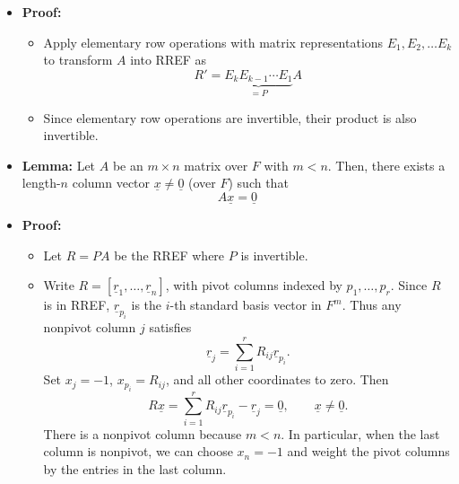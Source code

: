\documentclass[11pt,twoside]{report}
\newcommand{\vecnot}{\underline}
\newcommand{\Id}{{\mathrm{I}}}
\begin{document}
\begin{itemize}
\item \textbf{Proof:}
\begin{itemize}
\item Apply elementary row operations with matrix representations  $E_1, E_2, \dots E_k$ to transform $A$ into RREF as%
\[
R' = \underbrace{ E_k E_{k-1} \cdots E_1}_{  = P}  A 
\]
\item  Since elementary row operations are invertible, their product is also  invertible. 

\end{itemize}



\item \textbf{Lemma:} 
Let $A$ be an $m \times n$ matrix over $F$ with $m<n$. Then, there exists a length-$n$ column vector $\vecnot{x} \neq \vecnot{0}$ (over $F$) such that
\[
A \vecnot{x} = \vecnot{0}
\]

\item \textbf{Proof:} 
\begin{itemize}
\item Let $R = P A$ be the RREF where $P$ is invertible. 


\item Write $R=[\vecnot{r}_1,\ldots,\vecnot{r}_n]$, with pivot columns indexed by $p_1,\ldots,p_r$.  Since $R$ is in RREF, $\vecnot{r}_{p_i}$ is the $i$-th standard basis vector in $F^m$.  Thus any nonpivot column $j$ satisfies
\[
\vecnot{r}_j=\sum_{i=1}^r R_{ij}\vecnot{r}_{p_i}.
\]
Set $x_j=-1$, $x_{p_i}=R_{ij}$, and all other coordinates to zero.  Then
\[
R\vecnot{x}=\sum_{i=1}^r R_{ij}\vecnot{r}_{p_i}-\vecnot{r}_j=\vecnot{0},
\qquad \vecnot{x}\neq\vecnot{0}.
\]
There is a nonpivot column because $m<n$.  In particular, when the last column is nonpivot, we can choose $x_n=-1$ and weight the pivot columns by the entries in the last column.


\end{itemize}
\end{itemize}
\end{document}
